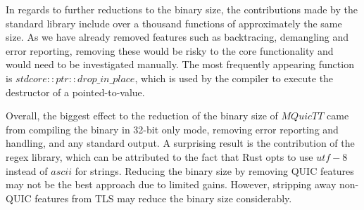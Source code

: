 In regards to further reductions to the binary size, the contributions made by the standard library include over a thousand functions of approximately the same size.
As we have already removed features such as backtracing, demangling and error reporting, removing these would be risky to the core functionality and would need to be investigated manually.
The most frequently appearing function is $std core::ptr::drop\_in\_place$, which is used by the compiler to execute the destructor of a pointed-to-value.

Overall, the biggest effect to the reduction of the binary size of $MQuicTT$ came from compiling the binary in 32-bit only mode, removing error reporting and handling, and any standard output.
A surprising result is the contribution of the regex library, which can be attributed to the fact that Rust opts to use $utf-8$ instead of $ascii$ for strings.
Reducing the binary size by removing QUIC features may not be the best approach due to limited gains.
However, stripping away non-QUIC features from TLS may reduce the binary size considerably.
